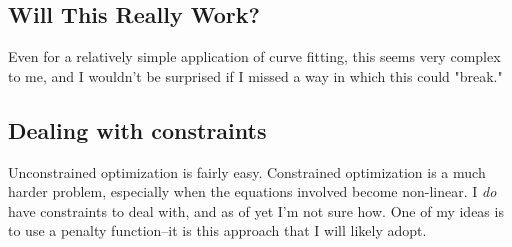 \documentclass[12pt, letterpaper]{article}
\begin{document}
\subsection*{Will This Really Work?}
Even for a relatively simple application of curve fitting, this seems very complex to me, and I wouldn't be surprised if I missed a way in which this could "break."
\subsection*{Dealing with constraints}
Unconstrained optimization is fairly easy. Constrained optimization is a much harder problem, especially when the equations involved become non-linear. I \emph{do} have constraints to deal with, and as of yet I'm not sure how. One of my ideas is to use a penalty function--it is this approach that I will likely adopt.
\end{document}

